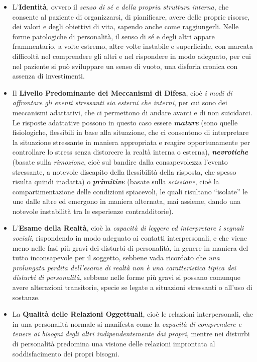 \documentclass[]{article}
\begin{document}
\begin{itemize}
\item
  L'\textbf{Identità}, ovvero il \emph{senso di sé e della propria
  struttura interna}, che consente al paziente di organizzarsi, di
  pianificare, avere delle proprie risorse, dei valori e degli obiettivi
  di vita, sapendo anche come raggiungerli. Nelle forme patologiche di
  personalità, il senso di sé e degli altri appare frammentario, a volte
  estremo, altre volte instabile e superficiale, con marcata difficoltà
  nel comprendere gli altri e nel rispondere in modo adeguato, per cui
  nel paziente si può sviluppare un senso di vuoto, una disforia cronica
  con assenza di investimenti.
\item
  Il \textbf{Livello Predominante dei Meccanismi di Difesa}, cioè
  \emph{i modi di affrontare gli eventi stressanti sia esterni che
  interni}, per cui sono dei meccanismi adattativi, che ci permettono di
  andare avanti e di non suicidarci. Le risposte adattative possono in
  questo caso essere \textbf{\emph{mature}} (sono quelle fisiologiche,
  flessibili in base alla situazione, che ci consentono di interpretare
  la situazione stressante in maniera appropriata e reagire
  opportunamente per controllare lo stress senza distorcere la realtà
  interna o esterna), \textbf{\emph{nevrotiche}} (basate sulla
  \emph{rimozione}, cioè sul bandire dalla consapevolezza l'evento
  stressante, a notevole discapito della flessibilità della risposta,
  che spesso risulta quindi inadatta) o \textbf{\emph{primitive}}
  (basate sulla \emph{scissione}, cioè la compartimentazione delle
  condizioni spiacevoli, le quali risultano ``isolate'' le une dalle
  altre ed emergono in maniera alternata, mai assieme, dando una
  notevole instabilità tra le esperienze contradditorie).
\item
  L'\textbf{Esame della Realtà}, cioè la \emph{capacità di leggere ed
  interpretare i segnali sociali}, rispondendo in modo adeguato ai
  contatti interpersonali, e che viene meno nelle fasi più gravi dei
  disturbi di personalità, in genere in maniera del tutto inconsapevole
  per il soggetto, sebbene vada ricordato che \emph{una prolungata
  perdita dell'esame di realtà non è una caratteristica tipica dei
  disturbi di personalità}, sebbene nelle forme più gravi si possano
  comunque avere alterazioni transitorie, specie se legate a situazioni
  stressanti o all'uso di sostanze.
\item
  La \textbf{Qualità delle Relazioni Oggettuali}, cioè le relazioni
  interpersonali, che in una personalità normale si manifesta come la
  \emph{capacità di comprendere e tenere ai bisogni degli altri
  indipendentemente dai propri}, mentre nei disturbi di personalità
  predomina una visione delle relazioni improntata al soddisfacimento
  dei propri bisogni.
\end{itemize}
\end{document}
